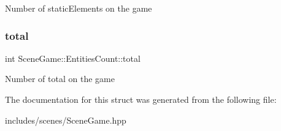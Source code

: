 Number of static\+Elements on the game \mbox{\label{struct_scene_game_1_1_entities_count_a2b9fb8c1c4f3b6f6b8d850e8f68cdd77}} 
\subsubsection{\texorpdfstring{total}{total}}
{\footnotesize\ttfamily int Scene\+Game\+::\+Entities\+Count\+::total}

Number of total on the game 

The documentation for this struct was generated from the following file\+:\begin{DoxyCompactItemize}
\item 
includes/scenes/Scene\+Game.\+hpp\end{DoxyCompactItemize}

